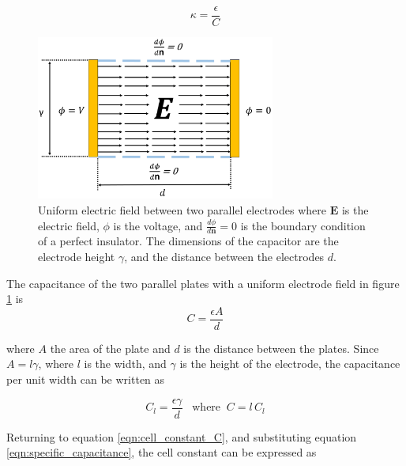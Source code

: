   \begin{equation}
      \kappa = \frac{\epsilon}{C}
      \label{eqn:cell_constant_C}
  \end{equation}
  
   \begin{figure}[ht]
  \centering
  \includegraphics[width=0.7\textwidth]{images/capacitorNoFringe.png}
  \caption[Uniform electric field between parallel plates]{Uniform electric field between two parallel electrodes where $\boldsymbol{E}$ is the electric field, $\phi$ is the voltage, and $\frac{d\phi}{d\boldsymbol{n}}=0$ is the boundary condition of a perfect insulator. The dimensions of the capacitor are the electrode height $\gamma$, and the distance between the electrodes $d$.}
  \label{fig:parallel_capacitor}
  \end{figure}
  
  \par The capacitance of the two parallel plates with a uniform electrode field in figure \ref{fig:parallel_capacitor} is
  \begin{equation}
      C = \frac{\epsilon A}{d}
      \label{eqn:capacitor}
  \end{equation}
  
  \noindent where $A$ the area of the plate and $d$ is the distance between the plates. Since $A = l\gamma$, where $l$ is the width, and $\gamma$ is the height of the electrode, the capacitance per unit width can be written as
  
  \begin{equation}
      C_l = \frac{\epsilon\gamma}{d} \;\;\;\text{where} \;\; C =l\, C_l
      \label{eqn:specific_capacitance}
  \end{equation}
  
  \par Returning to equation \ref{eqn:cell_constant_C}, and substituting equation \ref{eqn:specific_capacitance}, the cell constant can be expressed as 
  
